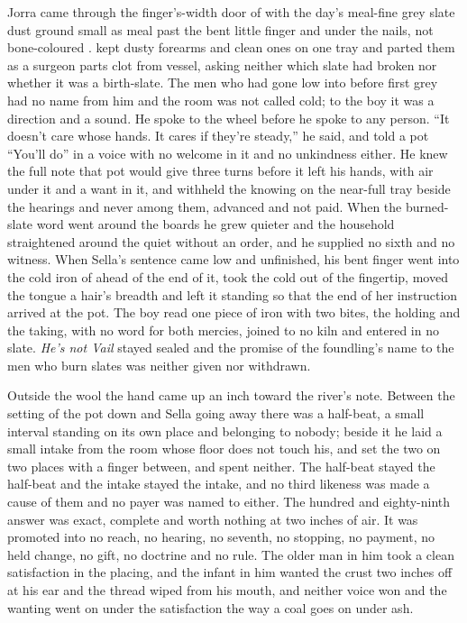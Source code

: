 Jorra came through the finger's-width door of  with the day's meal-fine grey slate dust ground small as meal past the bent little finger and under the nails, not bone-coloured .  kept dusty forearms and clean ones on one tray and parted them as a surgeon parts clot from vessel, asking neither which slate had broken nor whether it was a birth-slate. The men who had gone low into  before first grey had no name from him and the room was not called cold; to the boy it was a direction and a sound. He spoke to the wheel before he spoke to any person. “It doesn't care whose hands. It cares if they're steady,” he said, and told a pot “You'll do” in a voice with no welcome in it and no unkindness either. He knew the full note that pot would give three turns before it left his hands, with air under it and a want in it, and withheld the knowing on the near-full tray beside the hearings and never among them, advanced and not paid. When the burned-slate word went around the boards he grew quieter and the household straightened around the quiet without an order, and he supplied no sixth and no witness. When Sella's sentence came low and unfinished, his bent finger went into the cold iron of  ahead of the end of it, took the cold out of the fingertip, moved the tongue a hair's breadth and left it standing so that the end of her instruction arrived at the pot. The boy read one piece of iron with two bites, the holding and the taking, with no  word for both mercies, joined to no kiln and entered in no slate. \emph{He's not Vail} stayed sealed and the promise of the foundling's name to the men who burn slates was neither given nor withdrawn.

Outside the wool the hand came up an inch toward the river's note. Between the setting of the pot down and Sella going away there was a half-beat, a small interval standing on its own place and belonging to nobody; beside it he laid a small intake from the room whose floor does not touch his, and set the two on two places with a finger between, and spent neither. The half-beat stayed the half-beat and the intake stayed the intake, and no third likeness was made a cause of them and no payer was named to either. The hundred and eighty-ninth answer was exact, complete and worth nothing at two inches of air. It was promoted into no reach, no hearing, no seventh, no stopping, no payment, no held change, no gift, no doctrine and no rule. The older man in him took a clean satisfaction in the placing, and the infant in him wanted the crust two inches off at his ear and the thread wiped from his mouth, and neither voice won and the wanting went on under the satisfaction the way a coal goes on under ash.


